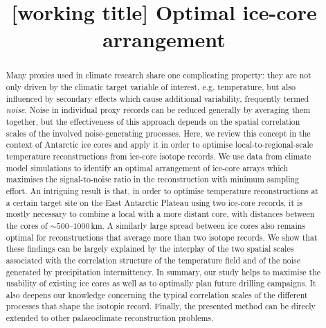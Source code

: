 \documentclass[cp, manuscript]{copernicus}
\begin{document}
\title{[working title] Optimal ice-core arrangement}




\received{}
\pubdiscuss{}
\revised{}
\accepted{}
\published{}


\maketitle

\begin{abstract} Many proxies used in climate research share one complicating
property: they are not only driven by the climatic target variable of interest,
e.g. temperature, but also influenced by secondary effects which cause
additional variability, frequently termed \emph{noise}. Noise in individual
proxy records can be reduced generally by averaging them together, but the
effectiveness of this approach depends on the spatial correlation scales of the
involved noise-generating processes. Here, we review this concept in the context
of Antarctic ice cores and apply it in order to optimise local-to-regional-scale
temperature reconstructions from ice-core isotope records. We use data from
climate model simulations to identify an optimal arrangement of ice-core arrays
which maximises the signal-to-noise ratio in the reconstruction with minimum
sampling effort. An intriguing result is that, in order to optimise
temperature reconstructions at a certain target site on the East Antarctic
Plateau using two ice-core records, it is mostly necessary to combine a local
with a more distant core, with distances between the cores of
$\sim500$--$1000$\,km. A similarly large spread between ice cores also remains
optimal for reconstructions that average more than two isotope records. We show
that these findings can be largely explained by the interplay of the two spatial
scales associated with the correlation structure of the temperature field and of
the noise generated by precipitation intermittency. In summary, our study helps
to maximise the usability of existing ice cores as well as to optimally plan
future drilling campaigns. It also deepens our knowledge concerning the typical
correlation scales of the different processes that shape the isotopic
record. Finally, the presented method can be direcly extended to other
palaeoclimate reconstruction problems.
\end{abstract}
\end{document}
